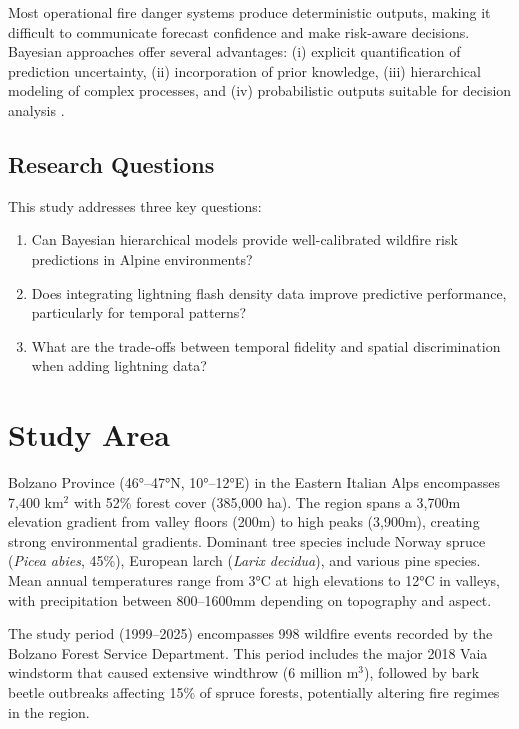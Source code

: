 \documentclass[11pt,a4paper]{article}
\begin{document}
Most operational fire danger systems produce deterministic outputs, making it difficult to communicate forecast confidence and make risk-aware decisions. Bayesian approaches offer several advantages: (i) explicit quantification of prediction uncertainty, (ii) incorporation of prior knowledge, (iii) hierarchical modeling of complex processes, and (iv) probabilistic outputs suitable for decision analysis \citep{Kruschke2015}.

\subsection{Research Questions}

This study addresses three key questions:

\begin{enumerate}
    \item Can Bayesian hierarchical models provide well-calibrated wildfire risk predictions in Alpine environments?
    \item Does integrating lightning flash density data improve predictive performance, particularly for temporal patterns?
    \item What are the trade-offs between temporal fidelity and spatial discrimination when adding lightning data?
\end{enumerate}

\section{Study Area}

Bolzano Province (46°--47°N, 10°--12°E) in the Eastern Italian Alps encompasses 7,400 km$^2$ with 52\% forest cover (385,000 ha). The region spans a 3,700m elevation gradient from valley floors (200m) to high peaks (3,900m), creating strong environmental gradients. Dominant tree species include Norway spruce (\textit{Picea abies}, 45\%), European larch (\textit{Larix decidua}), and various pine species. Mean annual temperatures range from 3°C at high elevations to 12°C in valleys, with precipitation between 800--1600mm depending on topography and aspect.

The study period (1999--2025) encompasses 998 wildfire events recorded by the Bolzano Forest Service Department. This period includes the major 2018 Vaia windstorm that caused extensive windthrow (6 million m$^3$), followed by bark beetle outbreaks affecting 15\% of spruce forests, potentially altering fire regimes in the region.
\end{document}
